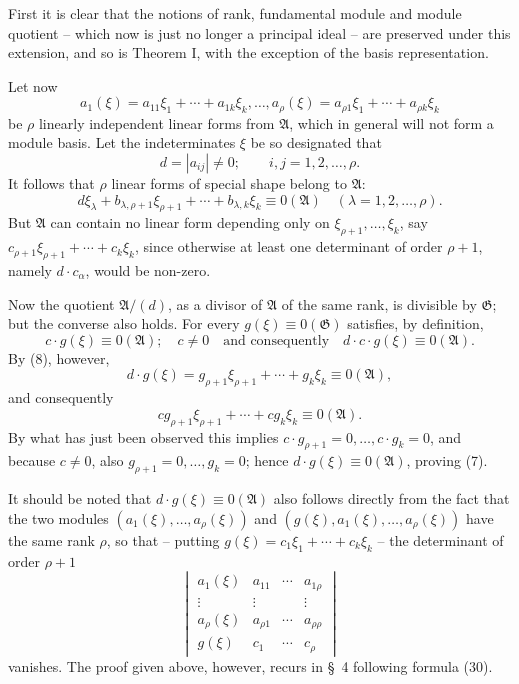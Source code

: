 \documentclass[11pt]{article}
\newcommand{\Amod}{\mathfrak A}
\newcommand{\Gmod}{\mathfrak G}
\newcommand{\zero}[1]{\equiv 0(#1)}
\begin{document}
First it is clear that the notions of rank, fundamental module and module quotient -- which now is just no longer a principal ideal -- are preserved under this extension, and so is Theorem I, with the exception of the basis representation.

Let now
\[
 a_1(\xi)=a_{11}\xi_1+\cdots+a_{1k}\xi_k,\ldots,
 a_\rho(\xi)=a_{\rho1}\xi_1+\cdots+a_{\rho k}\xi_k
\]
be $\rho$ linearly independent linear forms from $\Amod$, which in general will not form a module basis. Let the indeterminates $\xi$ be so designated that
\[
 d=|a_{ij}|\ne0;\qquad i,j=1,2,\ldots,\rho.
\]
It follows that $\rho$ linear forms of special shape belong to $\Amod$:
\begin{equation}
 d\xi_\lambda+b_{\lambda,\rho+1}\xi_{\rho+1}+\cdots+b_{\lambda,k}\xi_k\zero{\Amod}
 \quad(\lambda=1,2,\ldots,\rho).
\tag{8}
\end{equation}
But $\Amod$ can contain no linear form depending only on $\xi_{\rho+1},\ldots,\xi_k$, say $c_{\rho+1}\xi_{\rho+1}+\cdots+c_k\xi_k$, since otherwise at least one determinant of order $\rho+1$, namely $d\cdot c_\alpha$, would be non-zero.

Now the quotient $\Amod/(d)$, as a divisor of $\Amod$ of the same rank, is divisible by $\Gmod$; but the converse also holds. For every $g(\xi)\zero{\Gmod}$ satisfies, by definition,
\[
 c\cdot g(\xi)\zero{\Amod};\quad c\ne0
 \quad\text{and consequently}\quad d\cdot c\cdot g(\xi)\zero{\Amod}.
\]
By (8), however,
\[
 d\cdot g(\xi)=g_{\rho+1}\xi_{\rho+1}+\cdots+g_k\xi_k\zero{\Amod},
\]
and consequently
\[
 c g_{\rho+1}\xi_{\rho+1}+\cdots+c g_k\xi_k\zero{\Amod}.
\]
By what has just been observed this implies $c\cdot g_{\rho+1}=0,\ldots,c\cdot g_k=0$, and because $c\ne0$, also $g_{\rho+1}=0,\ldots,g_k=0$; hence $d\cdot g(\xi)\zero{\Amod}$, proving (7).

It should be noted that $d\cdot g(\xi)\zero{\Amod}$ also follows directly from the fact that the two modules $(a_1(\xi),\ldots,a_\rho(\xi))$ and $(g(\xi),a_1(\xi),\ldots,a_\rho(\xi))$ have the same rank $\rho$, so that -- putting $g(\xi)=c_1\xi_1+\cdots+c_k\xi_k$ -- the determinant of order $\rho+1$
\[
\begin{vmatrix}
 a_1(\xi)&a_{11}&\cdots&a_{1\rho}\\
 \vdots&\vdots&&\vdots\\
 a_\rho(\xi)&a_{\rho1}&\cdots&a_{\rho\rho}\\
 g(\xi)&c_1&\cdots&c_\rho
\end{vmatrix}
\]
vanishes. The proof given above, however, recurs in §~4 following formula (30).
\end{document}
